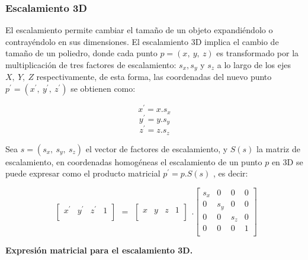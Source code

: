 \subsubsection{Escalamiento 3D}
El escalamiento permite cambiar el tamaño de un objeto expandiéndolo o contrayéndolo en sus dimensiones.
El escalamiento 3D implica el cambio de tamaño de un poliedro, donde cada punto $p = (x,\ y,\ z)$ es transformado por la multiplicación de tres factores de escalamiento: $s_{x}, s_{y}$ y $s_{z}$ a lo largo de los ejes $X,\ Y,\ Z$ respectivamente, de esta forma, las coordenadas del nuevo punto $p^{\prime} = ({x}^{ \prime},\ {y}^{ \prime},\ {z}^{ \prime})$ se obtienen como:

$${x}^{\prime} = x.s_{x}$$
$${y}^{\prime} = y.s_{y}$$
$${z}^{\prime} = z.s_{z}$$

Sea $s = (s_{x},\ s_{y},\ s_{z})$ el vector de factores de escalamiento, y $S(s)$ la matriz de
escalamiento, en coordenadas homogéneas el escalamiento de un punto $p$ en 3D se puede expresar como el producto matricial
$p^{\prime} = p.S(s)$ , es decir:

\begin{equation}
\begin{array}{rccl}
\left[
\begin{array}{rccl}
{x}^{\prime} & {y}^{\prime} & {z}^{\prime} & 1\\
\end{array}
\right]
\end{array}
=
\begin{array}{rccl}
\left[
\begin{array}{rccl}
x & y & z & 1\\
\end{array}
\right]
\end{array} 
.
\left[
\begin{array}{rccl}
s_{x} & 0 & 0 & 0\\
0 & s_{y} & 0 & 0\\
0 & 0 & s_{z} & 0\\
0 & 0 & 0 & 1\\
\end{array}
\right]   
\end{equation}


\begin{center}
\textbf{\footnotesize{Expresión matricial para el escalamiento 3D.}}
\end{center}


